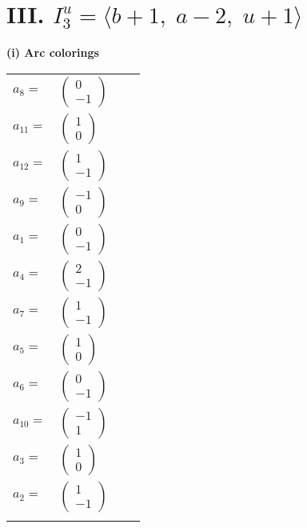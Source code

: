 \documentclass[1p]{elsarticle_modified}
\theoremstyle{definition}
\begin{document}
\centering \section*{III. $I^u_{3}= \langle b+1,\;a-2,\;u+1 \rangle$}
\flushleft \textbf{(i) Arc colorings}\\
\begin{tabular}{m{7pt} m{180pt} m{7pt} m{180pt} }
\flushright $a_{8}=$&$\begin{pmatrix}0\\-1\end{pmatrix}$ \\
\flushright $a_{11}=$&$\begin{pmatrix}1\\0\end{pmatrix}$ \\
\flushright $a_{12}=$&$\begin{pmatrix}1\\-1\end{pmatrix}$ \\
\flushright $a_{9}=$&$\begin{pmatrix}-1\\0\end{pmatrix}$ \\
\flushright $a_{1}=$&$\begin{pmatrix}0\\-1\end{pmatrix}$ \\
\flushright $a_{4}=$&$\begin{pmatrix}2\\-1\end{pmatrix}$ \\
\flushright $a_{7}=$&$\begin{pmatrix}1\\-1\end{pmatrix}$ \\
\flushright $a_{5}=$&$\begin{pmatrix}1\\0\end{pmatrix}$ \\
\flushright $a_{6}=$&$\begin{pmatrix}0\\-1\end{pmatrix}$ \\
\flushright $a_{10}=$&$\begin{pmatrix}-1\\1\end{pmatrix}$ \\
\flushright $a_{3}=$&$\begin{pmatrix}1\\0\end{pmatrix}$ \\
\flushright $a_{2}=$&$\begin{pmatrix}1\\-1\end{pmatrix}$\\&\end{tabular}
\end{document}
